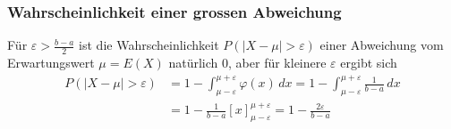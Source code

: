 \subsubsection{Wahrscheinlichkeit einer grossen Abweichung}
{\small
Für $\varepsilon>\frac{b-a}2$ ist die Wahrscheinlichkeit
$P(|X-\mu|>\varepsilon)$
einer Abweichung vom Erwartungswert $\mu=E(X)$ natürlich $0$,
aber für kleinere $\varepsilon$ ergibt sich
\begin{align*}
P(|X-\mu|>\varepsilon)
&=1-\int_{\mu-\varepsilon}^{\mu+\varepsilon}\varphi(x)\,dx
=1-\int_{\mu-\varepsilon}^{\mu+\varepsilon}\frac{1}{b-a}\,dx\\
&=1-\frac1{b-a}\left[x\right]_{\mu-\varepsilon}^{\mu+\varepsilon}=1-\frac{2\varepsilon}{b-a}
\end{align*}
}
